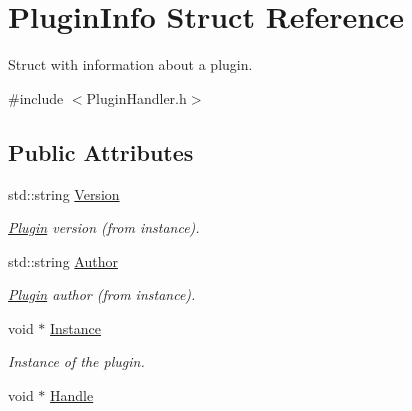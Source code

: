 \hypertarget{structPluginInfo}{\section{Plugin\-Info Struct Reference}
\label{structPluginInfo}
}


Struct with information about a plugin.  




{\ttfamily \#include $<$Plugin\-Handler.\-h$>$}

\subsection*{Public Attributes}
\begin{DoxyCompactItemize}
\item 
\hypertarget{structPluginInfo_a0bb7d324b76fa63166f7c53492971e86}{std\-::string \hyperlink{structPluginInfo_a0bb7d324b76fa63166f7c53492971e86}{Version}}\label{structPluginInfo_a0bb7d324b76fa63166f7c53492971e86}

\begin{DoxyCompactList}\small\item\em \hyperlink{classPlugin}{Plugin} version (from instance). \end{DoxyCompactList}\item 
\hypertarget{structPluginInfo_aae2dacfe0d928e4bf17b44c7356cfd93}{std\-::string \hyperlink{structPluginInfo_aae2dacfe0d928e4bf17b44c7356cfd93}{Author}}\label{structPluginInfo_aae2dacfe0d928e4bf17b44c7356cfd93}

\begin{DoxyCompactList}\small\item\em \hyperlink{classPlugin}{Plugin} author (from instance). \end{DoxyCompactList}\item 
\hypertarget{structPluginInfo_ad14fb40088de7f45f5cb6c9985124c78}{void $\ast$ \hyperlink{structPluginInfo_ad14fb40088de7f45f5cb6c9985124c78}{Instance}}\label{structPluginInfo_ad14fb40088de7f45f5cb6c9985124c78}

\begin{DoxyCompactList}\small\item\em Instance of the plugin. \end{DoxyCompactList}\item 
\hypertarget{structPluginInfo_a3fc5df25e8b7e3b63bd0e92f270364f2}{void $\ast$ \hyperlink{structPluginInfo_a3fc5df25e8b7e3b63bd0e92f270364f2}{Handle}}\label{structPluginInfo_a3fc5df25e8b7e3b63bd0e92f270364f2}


\end{DoxyCompactItemize}
